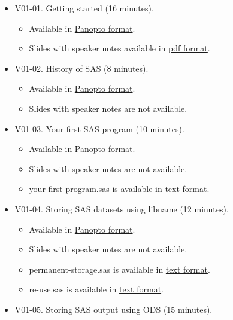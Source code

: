 \documentclass[
]{article}
\providecommand{\tightlist}{%
  \setlength{\itemsep}{0pt}\setlength{\parskip}{0pt}}
\begin{document}
\begin{itemize}
\tightlist
\item
  V01-01. Getting started (16 minutes).

  \begin{itemize}
  \tightlist
  \item
    Available in
    \href{https://umkc.hosted.panopto.com/Panopto/Pages/Viewer.aspx?id=3c8860e3-ec58-4873-ba83-aa68012a84c2}{Panopto
    format}.
  \item
    Slides with speaker notes available in
    \href{https://github.com/pmean/introduction-to-SAS/blob/master/basics1/results/getting-started.pdf}{pdf
    format}.
  \end{itemize}
\item
  V01-02. History of SAS (8 minutes).

  \begin{itemize}
  \tightlist
  \item
    Available in
    \href{https://umkc.hosted.panopto.com/Panopto/Pages/Viewer.aspx?id=ba88be23-73d8-4804-ada4-aa73011ac94a}{Panopto
    format}.
  \item
    Slides with speaker notes are not available.
  \end{itemize}
\item
  V01-03. Your first SAS program (10 minutes).

  \begin{itemize}
  \tightlist
  \item
    Available in
    \href{https://umkc.hosted.panopto.com/Panopto/Pages/Viewer.aspx?id=671572b5-a25a-46e0-8d85-aa730122496b}{Panopto
    format}.
  \item
    Slides with speaker notes are not available.
  \item
    your-first-program.sas is available in
    \href{https://github.com/pmean/introduction-to-SAS/tree/master/basics1/src/your-first-program.sas}{text
    format}.
  \end{itemize}
\item
  V01-04. Storing SAS datasets using libname (12 minutes).

  \begin{itemize}
  \tightlist
  \item
    Available in
    \href{https://umkc.hosted.panopto.com/Panopto/Pages/Viewer.aspx?id=a8dbb622-2d61-41a7-b6a4-aa7301264e3e}{Panopto
    format}.
  \item
    Slides with speaker notes are not available.
  \item
    permanent-storage.sas is available in
    \href{https://github.com/pmean/introduction-to-SAS/tree/master/basics1/src/permanent-storage.sas}{text
    format}.
  \item
    re-use.sas is available in
    \href{https://github.com/pmean/introduction-to-SAS/tree/master/basics1/src/re-use.sas}{text
    format}.
  \end{itemize}
\item
  V01-05. Storing SAS output using ODS (15 minutes).


\end{itemize}
\end{document}
